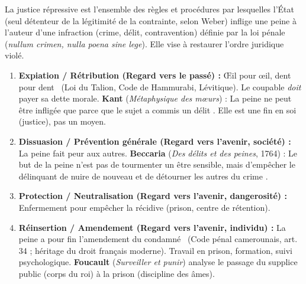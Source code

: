 \documentclass[11pt]{article}
\newcommand{\cle}[1]{{\popxbold\color{popdark}#1}}
\begin{document}
\begin{definition}
La justice répressive est l'ensemble des règles et procédures par lesquelles l'État (seul détenteur de la \cle{légitimité de la contrainte}, selon Weber) inflige une \cle{peine} à l'auteur d'une \cle{infraction} (crime, délit, contravention) définie par la \cle{loi pénale} (\emph{nullum crimen, nulla poena sine lege}). Elle vise à restaurer l'ordre juridique violé.
\end{definition}

\begin{aretenir}
\begin{enumerate}
    \item \textbf{Expiation / Rétribution (Regard vers le passé) :} \guillemotleft Œil pour œil, dent pour dent \guillemotright\ (Loi du Talion, Code de Hammurabi, Lévitique). Le coupable \emph{doit} payer sa dette morale. \textbf{Kant} (\emph{Métaphysique des mœurs}) : \guillemotleft La peine ne peut être infligée que parce que le sujet a commis un délit \guillemotright. Elle est une fin en soi (justice), pas un moyen.
    \item \textbf{Dissuasion / Prévention générale (Regard vers l'avenir, société) :} La peine fait peur aux autres. \textbf{Beccaria} (\emph{Des délits et des peines}, 1764) : \guillemotleft Le but de la peine n'est pas de tourmenter un être sensible, mais d'empêcher le délinquant de nuire de nouveau et de détourner les autres du crime \guillemotright.
    \item \textbf{Protection / Neutralisation (Regard vers l'avenir, dangerosité) :} Enfermement pour empêcher la récidive (prison, centre de rétention).
    \item \textbf{Réinsertion / Amendement (Regard vers l'avenir, individu) :} \guillemotleft La peine a pour fin l'amendement du condamné \guillemotright\ (Code pénal camerounais, art. 34 ; héritage du droit français moderne). Travail en prison, formation, suivi psychologique. \textbf{Foucault} (\emph{Surveiller et punir}) analyse le passage du supplice public (corps du roi) à la prison (discipline des âmes).
\end{enumerate}
\end{aretenir}
\end{document}
